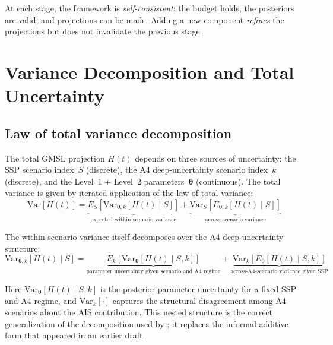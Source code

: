 \documentclass[11pt]{article}
\begin{document}
At each stage, the framework is \emph{self-consistent}: the budget holds, the posteriors are valid, and projections can be made.  Adding a new component \emph{refines} the projections but does not invalidate the previous stage.


\section{Variance Decomposition and Total Uncertainty}
\label{sec:variance}

\subsection{Law of total variance decomposition}

The total GMSL projection $H(t)$ depends on three sources of uncertainty: the SSP scenario index~$S$ (discrete), the A4 deep-uncertainty scenario index~$k$ (discrete), and the Level~1 + Level~2 parameters~$\boldsymbol{\theta}$ (continuous).  The total variance is given by iterated application of the law of total variance:
\begin{equation}
  \text{Var}[H(t)]
    = \underbrace{E_S\!\left[\text{Var}_{\boldsymbol{\theta},k}[H(t) \mid S]\right]}_{\text{expected within-scenario variance}}
    + \underbrace{\text{Var}_S\!\left[E_{\boldsymbol{\theta},k}[H(t) \mid S]\right]}_{\text{across-scenario variance}}
  \label{eq:variance-outer}
\end{equation}

The within-scenario variance itself decomposes over the A4 deep-uncertainty structure:
\begin{equation}
  \text{Var}_{\boldsymbol{\theta},k}[H(t) \mid S]
    = \underbrace{E_k\!\left[\text{Var}_{\boldsymbol{\theta}}[H(t) \mid S, k]\right]}_{\text{parameter uncertainty given scenario and A4 regime}}
    + \underbrace{\text{Var}_k\!\left[E_{\boldsymbol{\theta}}[H(t) \mid S, k]\right]}_{\text{across-A4-scenario variance given SSP}}
  \label{eq:variance-inner}
\end{equation}

Here $\text{Var}_{\boldsymbol{\theta}}[H(t) \mid S, k]$ is the posterior parameter uncertainty for a fixed SSP and A4 regime, and $\text{Var}_k[\cdot]$ captures the structural disagreement among A4 scenarios about the AIS contribution.  This nested structure is the correct generalization of the decomposition used by \citet{kopp2014probabilistic}; it replaces the informal additive form that appeared in an earlier draft.
\end{document}
